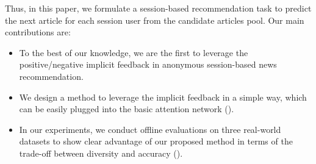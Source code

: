 Thus, in this paper, we formulate a session-based recommendation task to predict the next article 
for each session user from the candidate articles pool. Our main contributions are:
\begin{itemize} 
\item To the best of our knowledge, we are the first to leverage the positive/negative implicit feedback in anonymous session-based news recommendation. 
\item We design a method to leverage the 
implicit feedback in a simple way, which can be easily plugged into the basic attention network (). 
\item In our experiments, we conduct offline evaluations on three real-world datasets to show clear advantage
of our proposed method in terms of the trade-off between 
diversity and accuracy ().
\end{itemize}
